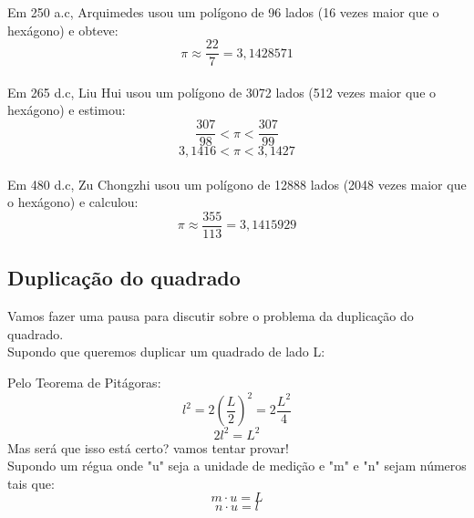 \documentclass[12pt]{article}
\begin{document}
Em 250 a.c, Arquimedes usou um polígono de 96 lados (16 vezes maior que o hexágono) e obteve:\[\pi\approx\frac{22}{7}=3,1428571\]\\
Em 265 d.c, Liu Hui usou um polígono de 3072 lados (512 vezes maior que o hexágono) e estimou:\[\frac{307}{98}<\pi<\frac{307}{99}\] \[3,1416<\pi<3,1427\]\\
Em 480 d.c, Zu Chongzhi usou um polígono de 12888 lados (2048 vezes maior que o hexágono) e calculou: \[\pi\approx\frac{355}{113}=3,1415929\]
\newpage
\subsection{Duplicação do quadrado}
Vamos fazer uma pausa para discutir sobre o problema da duplicação do quadrado.\\
Supondo que queremos duplicar um quadrado de lado L:

\begin{center}
    

\end{center}
Pelo Teorema de Pitágoras: \[l^2=2\left(\frac{L}{2}\right)^2=2\frac{L^2}{4}\] \[2l^2=L^2\]
Mas será que isso está certo? vamos tentar provar!\\
Supondo um régua onde "u" seja a unidade de medição e "m" e "n" sejam números tais que: 
\[m\cdot u=L\]
\[n\cdot u=l\]
\end{document}
